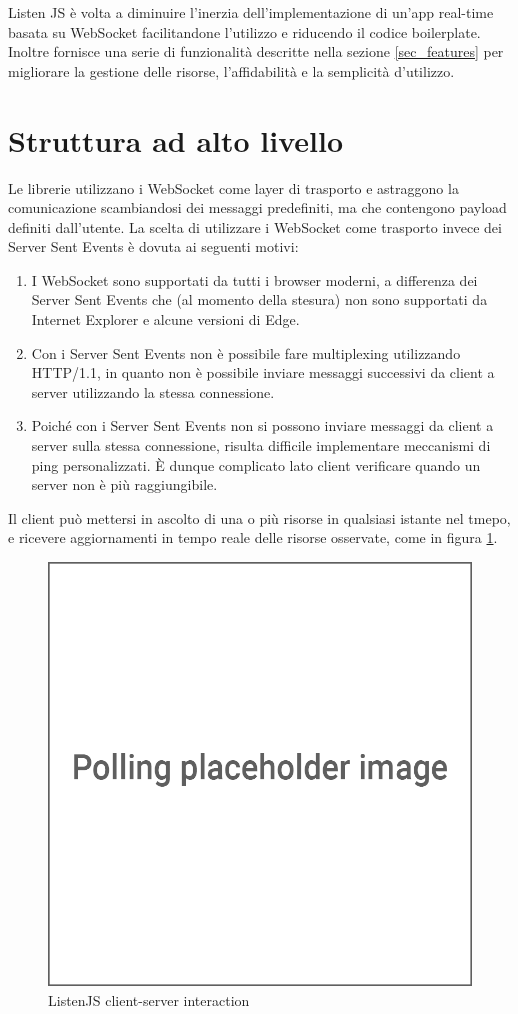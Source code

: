 \documentclass[12pt,a4paper,openright,twoside]{report}
\begin{document}
\bigskip

Listen JS è volta a diminuire l'inerzia dell'implementazione di un'app real-time basata su WebSocket facilitandone l'utilizzo e riducendo il codice boilerplate. Inoltre fornisce una serie di funzionalità descritte nella sezione \ref{sec_features} per migliorare la gestione delle risorse, l'affidabilità e la semplicità d'utilizzo.
\section{Struttura ad alto livello}\label{sec_struttura_alto_livello}
Le librerie utilizzano i WebSocket come layer di trasporto e astraggono la comunicazione scambiandosi dei messaggi predefiniti, ma che contengono payload definiti dall'utente.
La scelta di utilizzare i WebSocket come trasporto invece dei Server Sent Events è dovuta ai seguenti motivi:
\begin{enumerate}
\item I WebSocket sono supportati da tutti i browser moderni, a differenza dei Server Sent Events che (al momento della stesura) non sono supportati da Internet Explorer e alcune versioni di Edge.
\item Con i Server Sent Events non è possibile fare multiplexing utilizzando HTTP/1.1, in quanto non è possibile inviare messaggi successivi da client a server utilizzando la stessa connessione.
\item Poiché con i Server Sent Events non si possono inviare messaggi da client a server sulla stessa connessione, risulta difficile implementare meccanismi di ping personalizzati. È dunque complicato lato client verificare quando un server non è più raggiungibile.
\end{enumerate}
Il client può mettersi in ascolto di una o più risorse in qualsiasi istante nel tmepo, e ricevere aggiornamenti in tempo reale delle risorse osservate, come in figura \ref{fig:listenjs}.
\begin{figure}[!htbp]
\centering
\includegraphics[width=.5\textwidth]{assets/listenjs.png}
\caption{ListenJS client-server interaction}
\label{fig:listenjs}
\end{figure}
\end{document}
